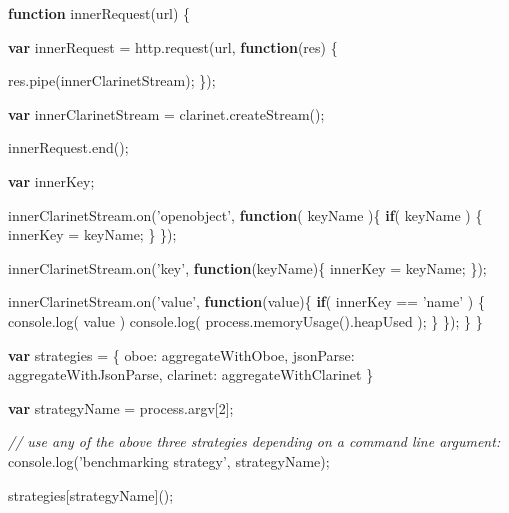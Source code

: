 \documentclass[]{article}
\newenvironment{Shaded}{}{}
\newcommand{\KeywordTok}[1]{\textcolor[rgb]{0.00,0.44,0.13}{\textbf{{#1}}}}
\newcommand{\DataTypeTok}[1]{\textcolor[rgb]{0.56,0.13,0.00}{{#1}}}
\newcommand{\DecValTok}[1]{\textcolor[rgb]{0.25,0.63,0.44}{{#1}}}
\newcommand{\StringTok}[1]{\textcolor[rgb]{0.25,0.44,0.63}{{#1}}}
\newcommand{\CommentTok}[1]{\textcolor[rgb]{0.38,0.63,0.69}{\textit{{#1}}}}
\newcommand{\OtherTok}[1]{\textcolor[rgb]{0.00,0.44,0.13}{{#1}}}
\newcommand{\FunctionTok}[1]{\textcolor[rgb]{0.02,0.16,0.49}{{#1}}}
\newcommand{\NormalTok}[1]{{#1}}
\begin{document}
\begin{Shaded}
\begin{Highlighting}[]
   
   \KeywordTok{function} \FunctionTok{innerRequest}\NormalTok{(url) \{}
      
      \KeywordTok{var} \NormalTok{innerRequest = }\OtherTok{http}\NormalTok{.}\FunctionTok{request}\NormalTok{(url, }\KeywordTok{function}\NormalTok{(res) \{}
                                 
         \OtherTok{res}\NormalTok{.}\FunctionTok{pipe}\NormalTok{(innerClarinetStream);}
      \NormalTok{\});}
      
      \KeywordTok{var} \NormalTok{innerClarinetStream = }\OtherTok{clarinet}\NormalTok{.}\FunctionTok{createStream}\NormalTok{();}
      
      \OtherTok{innerRequest}\NormalTok{.}\FunctionTok{end}\NormalTok{();            }
      
      \KeywordTok{var} \NormalTok{innerKey;}
      
      \OtherTok{innerClarinetStream}\NormalTok{.}\FunctionTok{on}\NormalTok{(}\StringTok{'openobject'}\NormalTok{, }\KeywordTok{function}\NormalTok{( keyName )\{      }
         \KeywordTok{if}\NormalTok{( keyName ) \{}
            \NormalTok{innerKey = keyName;      }
         \NormalTok{\}}
      \NormalTok{\});}
      
      \OtherTok{innerClarinetStream}\NormalTok{.}\FunctionTok{on}\NormalTok{(}\StringTok{'key'}\NormalTok{, }\KeywordTok{function}\NormalTok{(keyName)\{}
         \NormalTok{innerKey = keyName;}
      \NormalTok{\});}
      
      \OtherTok{innerClarinetStream}\NormalTok{.}\FunctionTok{on}\NormalTok{(}\StringTok{'value'}\NormalTok{, }\KeywordTok{function}\NormalTok{(value)\{}
         \KeywordTok{if}\NormalTok{( innerKey == }\StringTok{'name'} \NormalTok{) \{}
            \OtherTok{console}\NormalTok{.}\FunctionTok{log}\NormalTok{( value )}
            \OtherTok{console}\NormalTok{.}\FunctionTok{log}\NormalTok{( }\OtherTok{process}\NormalTok{.}\FunctionTok{memoryUsage}\NormalTok{().}\FunctionTok{heapUsed} \NormalTok{);            }
         \NormalTok{\}}
      \NormalTok{\});            }
   \NormalTok{\}}
\NormalTok{\}}

\KeywordTok{var} \NormalTok{strategies = \{}
   \DataTypeTok{oboe}\NormalTok{:       aggregateWithOboe,}
   \DataTypeTok{jsonParse}\NormalTok{:  aggregateWithJsonParse,}
   \DataTypeTok{clarinet}\NormalTok{:   aggregateWithClarinet}
\NormalTok{\}}

\KeywordTok{var} \NormalTok{strategyName = }\OtherTok{process}\NormalTok{.}\FunctionTok{argv}\NormalTok{[}\DecValTok{2}\NormalTok{];}

\CommentTok{// use any of the above three strategies depending on a command line argument:}
\OtherTok{console}\NormalTok{.}\FunctionTok{log}\NormalTok{(}\StringTok{'benchmarking strategy'}\NormalTok{, strategyName);}

\NormalTok{strategies[strategyName]();}

\end{Highlighting}
\end{Shaded}
\end{document}

